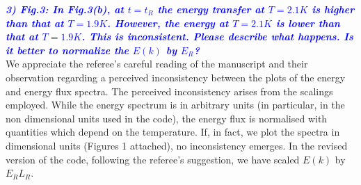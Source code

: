 \documentclass[a4paper,10pt]{article}
\def\red#1{\textcolor{black}{#1}}
\def\blue#1{\textcolor{blue}{#1}}
\def\refcomment#1{\textbf{\blue{\emph{#1}}}\\}
\begin{document}





    \refcomment{3) Fig.3: In Fig.3(b), at $t = t_R$ the energy transfer at $T = 2.1K$ is
    higher than that at $T = 1.9K$. However, the energy at $T = 2.1K$ is lower
    than that at $T = 1.9K$. This is inconsistent. Please describe what
    happens. Is it better to normalize the $E(k)$ by $E_R$?}

    We appreciate the referee’s careful reading of the manuscript and 
their observation regarding a perceived inconsistency between the plots of 
the energy and energy flux spectra. The perceived inconsistency arises 
from the scalings employed. While the energy spectrum is in arbitrary 
units (in particular, in the non dimensional units \red{used in} the code), 
the energy flux is normalised with quantities which depend on the temperature. 
If, in fact, we plot the spectra in dimensional units (Figures 1 attached),
no inconsistency emerges. In the revised version of the code, following 
the referee's suggestion, we have scaled $E(k)$ by $E_R L_R$.
    
\end{document}
